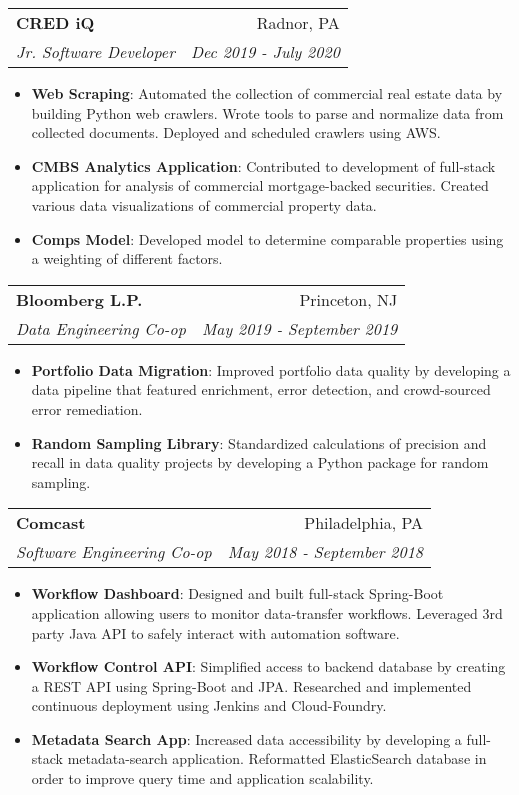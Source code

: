 \documentclass[letterpaper,11pt]{article}
\makeatletter
\newcommand{\resumeItem}[2]{
  \item\small{
    \textbf{#1}{: #2 \vspace{-2pt}}
  }
}
\newcommand{\resumeSubheading}[4]{
  \vspace{-1pt}\item
    \begin{tabular*}{0.97\textwidth}{l@{\extracolsep{\fill}}r}
      \textbf{#1} & #2 \\
      \textit{\small#3} & \textit{\small #4} \\
    \end{tabular*}\vspace{-5pt}
}
\newcommand{\resumeItemListStart}{\begin{itemize}}
\newcommand{\resumeItemListEnd}{\end{itemize}\vspace{-5pt}}
\makeatother
\begin{document}
       
      
  
  \resumeSubheading
      {CRED iQ}{Radnor, PA}
      {Jr. Software Developer}{Dec 2019 - July 2020}
      \resumeItemListStart
      \resumeItem{Web Scraping}
          {Automated the collection of commercial real estate data by building Python web crawlers. Wrote tools to parse and normalize data from collected documents. Deployed and scheduled crawlers using AWS.}
          \resumeItem{CMBS Analytics Application}
          {Contributed to development of full-stack application for analysis of commercial mortgage-backed securities. Created various data visualizations of commercial property data.} 
          \resumeItem{Comps Model}
          {Developed model to determine comparable properties using a weighting of different factors.} 
          
      
      \resumeItemListEnd

	\resumeSubheading
      {Bloomberg L.P.}{Princeton, NJ}
      {Data Engineering Co-op}{May 2019 - September 2019}
            \resumeItemListStart
      \resumeItem{Portfolio Data Migration}
          {Improved portfolio data quality by developing a data pipeline that featured enrichment, error detection, and crowd-sourced error remediation.}
        
        \resumeItem{Random Sampling Library}
         {Standardized calculations of precision and recall in data quality projects by developing a Python package for random sampling. }
          
      \resumeItemListEnd

    

    \resumeSubheading
      {Comcast}{Philadelphia, PA}
      {Software Engineering Co-op}{May 2018 - September 2018}
      \resumeItemListStart
      \resumeItem{Workflow Dashboard}
          {Designed and built full-stack Spring-Boot application allowing users to monitor data-transfer workflows. Leveraged 3rd party Java API to safely interact with automation software.}
        
        \resumeItem{Workflow Control API}
          {Simplified access to backend database by creating a REST API using Spring-Boot and JPA. Researched and implemented continuous deployment using Jenkins and Cloud-Foundry.
          }
          \resumeItem{Metadata Search App}
          {Increased data accessibility by developing a full-stack metadata-search application. Reformatted ElasticSearch database in order to improve query time and application scalability. }
      \resumeItemListEnd
\end{document}
